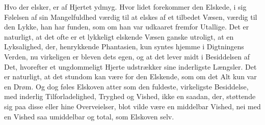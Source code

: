 \documentclass[12pt,a4paper]{book}
\begin{document}
Hvo der elsker, er af Hjertet ydmyg. Hvor lidet forekommer den
Elskede, i sig Følelsen af sin Mangelfuldhed værdig til at elskes af
et tilbedet Væsen, værdig til den Lykke, han har funden, som om han var
udkaaret fremfor Utallige. Det er naturligt, at det ofte er et
lykkeligt elskende Væsen ganske utroligt, at en Lyksalighed, der,
henrykkende Phantasien, kun syntes hjemme i Digtningens Verden, nu
virkeligen er bleven dets egen, og at det lever midt i Besiddelsen af
Det, hvorefter et ungdommeligt Hjerte udstrækker sine inderligste
Længsler. Det er naturligt, at det stundom kan være for den Elskende,
som om det Alt kun var en Drøm. Og dog føles Elskoven atter som den
fuldeste, virkeligste Besiddelse, med inderlig Tilforladelighed, Tryghed
og Vished, ikke en saadan, der, støttende sig paa disse eller hine
Overveielser, blot vilde være en middelbar Vished, nei med en Vished
saa umiddelbar og total, som Elskoven selv.
\end{document}
